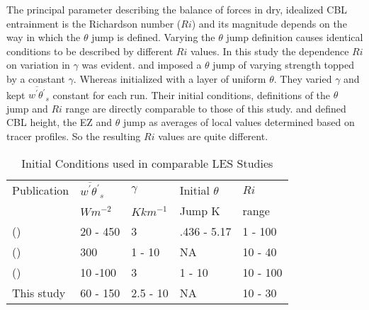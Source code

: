 The principal parameter describing the balance of forces in dry, idealized CBL entrainment is the Richardson number ($Ri$) and its magnitude depends on the way in which the $\theta$ jump is defined.  Varying the $\theta$ jump definition causes identical conditions to be described by different $Ri$ values.  In this study the dependence $Ri$ on variation in $\gamma$ was evident.  \cite{BrooksFowler2} and \cite{SullMoengStev} imposed a $\theta$ jump of varying strength topped by a constant $\gamma$.  Whereas \cite{FedConzMir04} initialized with a layer of uniform $\theta$.  They varied $\gamma$ and kept $\overline{w^{'}\theta^{'}}_{s}$ constant for each run.  Their initial conditions, definitions of the $\theta$ jump and $Ri$ range are directly comparable to those of this study.  \cite{BrooksFowler2} and \cite{SullMoengStev} defined CBL height, the EZ and $\theta$ jump as averages of local values determined based on tracer profiles.  So the resulting $Ri$ values are quite different.    

\begin{table}[htbp]
\caption[Initial Conditions used in comparable LES Studies]{Initial Conditions used in comparable LES Studies}

    \begin{tabular}{ p{4cm} p{1.4cm} p{1.4cm} p{1.7cm} p{1.8cm}}
Publication & $\overline{w^{'}\theta^{'}}_{s}$& $\gamma$& Initial $\theta$ & $Ri$ \\ 
& $Wm^{-2}$ & $Kkm^{-1}$ & Jump K & range \\ \hline
      \citeauthor{SullMoengStev} (\citeyear{SullMoengStev}) & 20 - 450& 3  &.436 - 5.17 & 1 - 100\\ %
      \citeauthor{FedConzMir04} (\citeyear{FedConzMir04}) & 300 & 1 - 10 & NA & 10 - 40\\ %
      \citeauthor{BrooksFowler2} (\citeyear{BrooksFowler2}) &  10 -100 &  3& 1 - 10 &10 - 100 \\ %
      This study & 60 - 150 & 2.5 - 10& NA & 10 - 30\\ \hline 
      
    \end{tabular}
\label{table:initconditcomp}   
\end{table}

